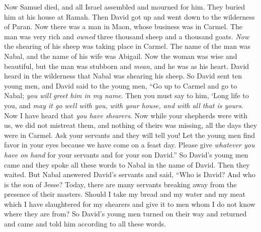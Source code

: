 \begin{biblechapter} %
 Now Samuel died, and all Israel assembled and mourned for him. They buried him at his house at Ramah. Then David got up and went down to the wilderness of Paran.
 Now there was a man in Maon, whose business was in Carmel. The man was very rich and \textit{owned} three thousand sheep and a thousand goats. \textit{Now} the shearing of his sheep was taking place in Carmel.
\verse The name of the man was Nabal, and the name of his wife was Abigail. Now the woman was wise and beautiful, but the man was stubborn and \textit{mean}, and he was as his heart.
\verse David heard in the wilderness that Nabal was shearing his sheep.
\verse So David sent ten young men, and David said to the young men, “Go up to Carmel and go to Nabal; \textit{you will greet him in my name}.
\verse Then you must say to him, ‘Long life to you, and \textit{may it go well with you, with your house, and with all that is yours}.
\verse Now I have heard that \textit{you have shearers}. Now while your shepherds were with us, we did not mistreat them, and nothing of theirs was missing, all the days they were in Carmel.
\verse Ask your servants and they will tell you! Let the young men find favor in your eyes because we have come on a feast day. Please give \textit{whatever you have on hand} for your servants and for your son David.”
\verse So David’s young men came and they spoke all these words to Nabal in the name of David. Then they waited.
\verse But Nabal answered David’s servants and said, “Who is David? And who is the son of Jesse? Today, there are many servants breaking away from the presence of their masters.
\verse Should I take my bread and my water and my meat which I have slaughtered for my shearers and give it to men whom I do not know where they are from?
\verse So David’s young men turned on their way and returned and came and told him according to all these words.

\end{biblechapter}
